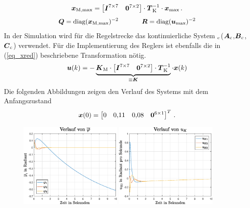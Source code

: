 \begin{equation}
\boldsymbol{x}_{\text{M,max}} = \begin{bmatrix}
\boldsymbol{I}^{7\times 7} & \boldsymbol{0}^{7\times 2}
\end{bmatrix}\cdot \boldsymbol{T}^{-1}_{\text{K}} \cdot \boldsymbol{x}_{\text{max}} \,.
\label{eq_xred}
\end{equation}
\begin{equation}
\boldsymbol{Q} = \text{diag}(\boldsymbol{x}_{\text{M,max}})^{-2} \hspace{35pt} \boldsymbol{R} = \text{diag}(\boldsymbol{u}_{\text{max}})^{-2}
\end{equation}
In der Simulation wird für die Regelstrecke das kontinuierliche System $_{\text{c}}$($\boldsymbol{A}_{\text{c}}$,$\boldsymbol{B}_{\text{c}}$,$\boldsymbol{C}_{\text{c}}$) verwendet. Für die Implementierung des Reglers ist ebenfalls die in (\ref{eq_xred}) beschriebene Transformation nötig.
\begin{equation}
\boldsymbol{u}(k) = -\underbrace{\boldsymbol{K}_{\text{M}}\cdot \begin{bmatrix}
\boldsymbol{I}^{7\times 7} & \boldsymbol{0}^{7\times 2}
\end{bmatrix} \cdot \boldsymbol{T}^{-1}_{\text{K}}}_{\equiv \boldsymbol{K}} \cdot \boldsymbol{x}(k)
\end{equation}
Die folgenden Abbildungen zeigen den Verlauf des Systems mit dem Anfangszustand
\begin{equation}
\boldsymbol{x}(0) = \begin{bmatrix}
0 & 0{,}11 & 0{,}08 & \boldsymbol{0}^{6\times 1}
\end{bmatrix}^T \,.
\end{equation}
\vspace*{-1cm}

\begin{figure}[!ht]
\centering
\includegraphics[width=0.45\textwidth]{img/lin_sim1_phi.eps}\hspace{0.7cm}
\includegraphics[width=0.45\textwidth]{img/lin_sim1_uk.eps}
\end{figure}
\pagebreak

